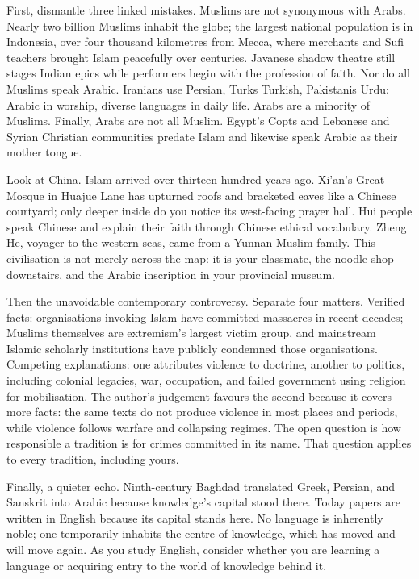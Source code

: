 First, dismantle three linked mistakes. Muslims are not synonymous with Arabs. Nearly two billion Muslims inhabit the globe; the largest national population is in Indonesia, over four thousand kilometres from Mecca, where merchants and Sufi teachers brought Islam peacefully over centuries. Javanese shadow theatre still stages Indian epics while performers begin with the profession of faith. Nor do all Muslims speak Arabic. Iranians use Persian, Turks Turkish, Pakistanis Urdu: Arabic in worship, diverse languages in daily life. Arabs are a minority of Muslims. Finally, Arabs are not all Muslim. Egypt's Copts and Lebanese and Syrian Christian communities predate Islam and likewise speak Arabic as their mother tongue.

Look at China. Islam arrived over thirteen hundred years ago. Xi'an's Great Mosque in Huajue Lane has upturned roofs and bracketed eaves like a Chinese courtyard; only deeper inside do you notice its west-facing prayer hall. Hui people speak Chinese and explain their faith through Chinese ethical vocabulary. Zheng He, voyager to the western seas, came from a Yunnan Muslim family. This civilisation is not merely across the map: it is your classmate, the noodle shop downstairs, and the Arabic inscription in your provincial museum.

Then the unavoidable contemporary controversy. Separate four matters. Verified facts: organisations invoking Islam have committed massacres in recent decades; Muslims themselves are extremism's largest victim group, and mainstream Islamic scholarly institutions have publicly condemned those organisations. Competing explanations: one attributes violence to doctrine, another to politics, including colonial legacies, war, occupation, and failed government using religion for mobilisation. The author's judgement favours the second because it covers more facts: the same texts do not produce violence in most places and periods, while violence follows warfare and collapsing regimes. The open question is how responsible a tradition is for crimes committed in its name. That question applies to every tradition, including yours.

Finally, a quieter echo. Ninth-century Baghdad translated Greek, Persian, and Sanskrit into Arabic because knowledge's capital stood there. Today papers are written in English because its capital stands here. No language is inherently noble; one temporarily inhabits the centre of knowledge, which has moved and will move again. As you study English, consider whether you are learning a language or acquiring entry to the world of knowledge behind it.


